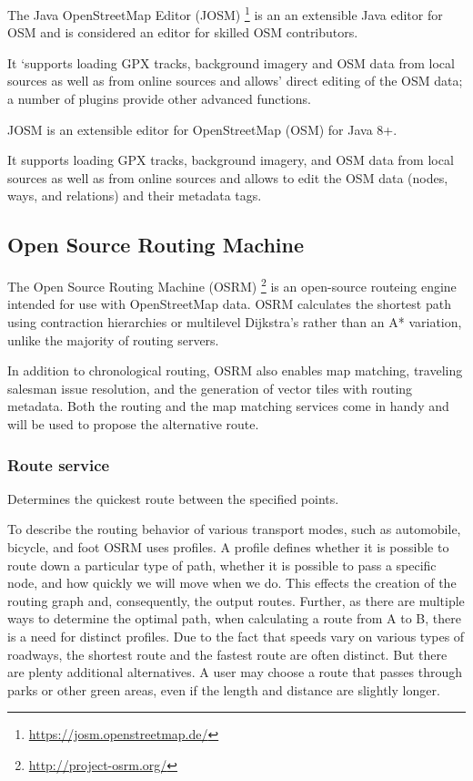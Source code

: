 The Java OpenStreetMap Editor (JOSM) \footnote{\url{https://josm.openstreetmap.de/}} is an an extensible Java editor for OSM and is considered an editor for skilled OSM contributors. 

It ‘supports loading GPX tracks, background imagery and OSM data from local sources as well as from online sources and allows’ direct editing of the OSM data; a number of plugins provide other advanced functions. 

JOSM is an extensible editor for ​OpenStreetMap (OSM) for ​Java 8+.

 It supports loading GPX tracks, background imagery, and OSM data from local sources as well as from online sources and allows to edit the OSM data (nodes, ways, and relations) and their metadata tags. 
 
 




\subsection{Open Source Routing Machine}

The Open Source Routing Machine (OSRM) \footnote{\url{http://project-osrm.org/}} is an open-source routeing engine intended for use with OpenStreetMap data. OSRM calculates the shortest path using contraction hierarchies or multilevel Dijkstra's rather than an A* variation, unlike the majority of routing servers. \autocite[]{Delling2012}

In addition to chronological routing, OSRM also enables map matching, traveling salesman issue resolution, and the generation of vector tiles with routing metadata. Both the routing and the map matching services come in handy and will be used to propose the alternative route. 

\subsubsection{Route service}

Determines the quickest route between the specified points. 

To describe the routing behavior of various transport modes, such as automobile, bicycle, and foot OSRM uses profiles. A profile defines whether it is possible to route down a particular type of path, whether it is possible to pass a specific node, and how quickly we will move when we do. This effects the creation of the routing graph and, consequently, the output routes. Further, as there are multiple ways to determine the optimal path, when calculating a route from A to B, there is a need for distinct profiles. Due to the fact that speeds vary on various types of roadways, the shortest route and the fastest route are often distinct. But there are plenty additional alternatives. A user may choose a route that passes through parks or other green areas, even if the length and distance are slightly longer. 

